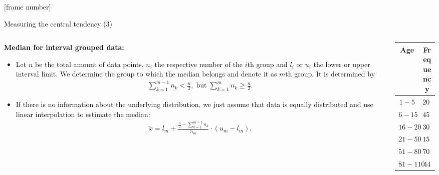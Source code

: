 \documentclass[aspectratio=169,t]{beamer}
\begin{document}
  {
    [frame number]
    \begin{frame}{Measuring the central tendency (3)}
      \begin{columns}
        \begin{column}{0.6\textwidth}
          \textbf{Median for interval grouped data:}
          \begin{itemize}[noitemsep]
            \item Let $n$ be the total amount of data points, $n_i$ the respective number of the $i$th group and $l_i$ or $u_i$ the lower or upper interval limit. We determine the group to which the median belongs and denote it as $m$th group. It is determined by
            \begin{align}
              \sum_{k=1}^{m-1}n_k < \frac{n}{2}, \; \text{but} \; \sum_{k=1}^{m} n_k \geq \frac{n}{2}.
            \end{align}
            \item If there is no information about the underlying distribution, we just assume that data is equally distributed and use linear interpolation to estimate the median:
            \begin{align}
              \tilde{x} = l_m + \frac{\frac{n}{2}-\sum_{k=1}^{m-1}n_k}{n_m} \cdot (u_m-l_m).
            \end{align}
          \end{itemize}
        \end{column}
        \begin{column}{0.3\textwidth}  %
        \begin{table}
        \begin{tabular}{|c|c|}
          Age & Frequency \\ \hline
          $1-5$ & $200$ \\
          $6-15$ & $450$ \\
          $16-20$ & $300$ \\
          $21-50$ & $1500$ \\
          $51-80$ & $700$ \\
          $81-110$ & $44$
        \end{tabular}\\[0.5cm]
        \end{table}
        \end{column}
      \end{columns}
    \end{frame}
  }
\end{document}
